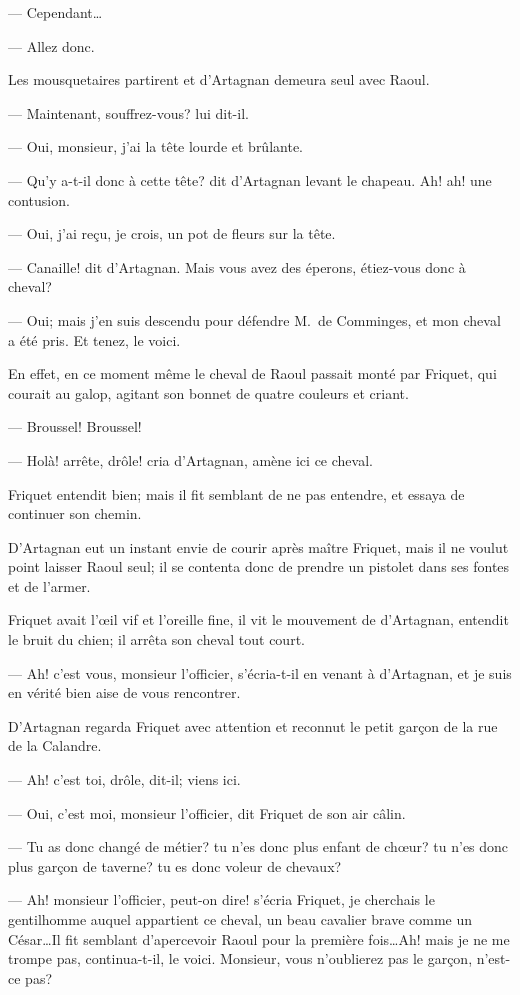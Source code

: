 — Cependant\dots

— Allez donc.

Les mousquetaires partirent et d'Artagnan demeura seul avec Raoul.

— Maintenant, souffrez-vous? lui dit-il.

— Oui, monsieur, j'ai la tête lourde et brûlante.

— Qu'y a-t-il donc à cette tête? dit d'Artagnan levant le chapeau. Ah! ah! une contusion.

— Oui, j'ai reçu, je crois, un pot de fleurs sur la tête.

— Canaille! dit d'Artagnan. Mais vous avez des éperons, étiez-vous donc à cheval?

— Oui; mais j'en suis descendu pour défendre M.~de Comminges, et mon cheval a été pris. Et tenez, le voici.

En effet, en ce moment même le cheval de Raoul passait monté par Friquet, qui courait au galop, agitant son bonnet de quatre couleurs et criant.

— Broussel! Broussel!

— Holà! arrête, drôle! cria d'Artagnan, amène ici ce cheval.

Friquet entendit bien; mais il fit semblant de ne pas entendre, et essaya de continuer son chemin.

D'Artagnan eut un instant envie de courir après maître Friquet, mais il ne voulut point laisser Raoul seul; il se contenta donc de prendre un pistolet dans ses fontes et de l'armer.

Friquet avait l'œil vif et l'oreille fine, il vit le mouvement de d'Artagnan, entendit le bruit du chien; il arrêta son cheval tout court.

— Ah! c'est vous, monsieur l'officier, s'écria-t-il en venant à d'Artagnan, et je suis en vérité bien aise de vous rencontrer.

D'Artagnan regarda Friquet avec attention et reconnut le petit garçon de la rue de la Calandre.

— Ah! c'est toi, drôle, dit-il; viens ici.

— Oui, c'est moi, monsieur l'officier, dit Friquet de son air câlin.

— Tu as donc changé de métier? tu n'es donc plus enfant de chœur? tu n'es donc plus garçon de taverne? tu es donc voleur de chevaux?

— Ah! monsieur l'officier, peut-on dire! s'écria Friquet, je cherchais le gentilhomme auquel appartient ce cheval, un beau cavalier brave comme un César\dots Il fit semblant d'apercevoir Raoul pour la première fois\dots Ah! mais je ne me trompe pas, continua-t-il, le voici. Monsieur, vous n'oublierez pas le garçon, n'est-ce pas?


